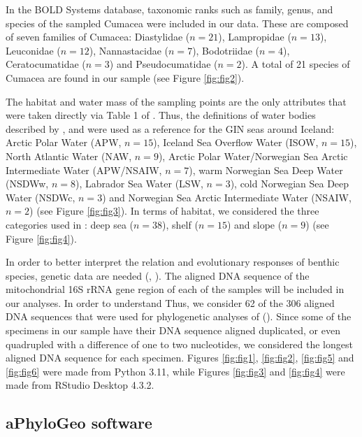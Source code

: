 In the BOLD Systems database, taxonomic ranks such as family, genus, and species of the sampled Cumacea were included in our data. These are composed of seven families of Cumacea: Diastylidae (\( n=21 \)), Lampropidae (\( n=13 \)), Leuconidae (\( n=12 \)), Nannastacidae (\( n=7 \)), Bodotriidae (\( n=4 \)), Ceratocumatidae (\( n=3 \)) and Pseudocumatidae (\( n=2 \)). A total of 21 species of Cumacea are found in our sample (see Figure \ref{fig:fig2}).

The habitat and water mass of the sampling points are the only attributes that were taken directly via Table 1 of \citep{uhlir_adding_2021}. Thus, the definitions of water bodies described by \citep{hansen_north_2000},\citep{brix2010distribution} and \citep{ostmann_marine_2014} were used as a reference for the GIN seas around Iceland: Arctic Polar Water (APW, \( n=15 \)), Iceland Sea Overflow Water (ISOW, \( n=15 \)), North Atlantic Water (NAW, \( n=9 \)), Arctic Polar Water/Norwegian Sea Arctic Intermediate Water (APW/NSAIW, \( n=7 \)), warm Norwegian Sea Deep Water (NSDWw, \( n=8 \)), Labrador Sea Water (LSW, \( n=3 \)), cold Norwegian Sea Deep Water (NSDWc, \( n=3 \)) and Norwegian Sea Arctic Intermediate Water (NSAIW, \( n=2 \)) (see Figure \ref{fig:fig3}). In terms of habitat, we considered the three categories used in \citep{uhlir_adding_2021}: deep sea (\( n=38 \)), shelf (\( n=15 \)) and slope (\( n=9 \)) (see Figure \ref{fig:fig4}).

In order to better interpret the relation and evolutionary responses of benthic species, genetic data are needed (\citep{wilson_speciation_1987}, \citep{uhlir_adding_2021}). The aligned DNA sequence of the mitochondrial 16S rRNA gene region of each of the samples will be included in our analyses. In order to understand  Thus, we consider 62 of the 306 aligned DNA sequences that were used for phylogenetic analyses of (\citep{uhlir_adding_2021}). Since some of the specimens in our sample have their DNA sequence aligned duplicated, or even quadrupled with a difference of one to two nucleotides, we considered the longest aligned DNA sequence for each specimen. Figures  \ref{fig:fig1},  \ref{fig:fig2}, \ref{fig:fig5} and \ref{fig:fig6} were made from Python 3.11, while Figures \ref{fig:fig3} and \ref{fig:fig4} were made from RStudio Desktop 4.3.2.

\subsection{aPhyloGeo software}

